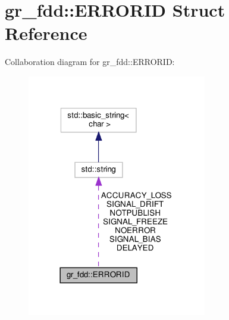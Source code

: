 \hypertarget{structgr__fdd_1_1ERRORID}{}\section{gr\+\_\+fdd\+:\+:E\+R\+R\+O\+R\+ID Struct Reference}
\label{structgr__fdd_1_1ERRORID}


Collaboration diagram for gr\+\_\+fdd\+:\+:E\+R\+R\+O\+R\+ID\+:
\nopagebreak
\begin{figure}[H]
\begin{center}
\leavevmode
\includegraphics[width=222pt]{structgr__fdd_1_1ERRORID__coll__graph}
\end{center}
\end{figure}
